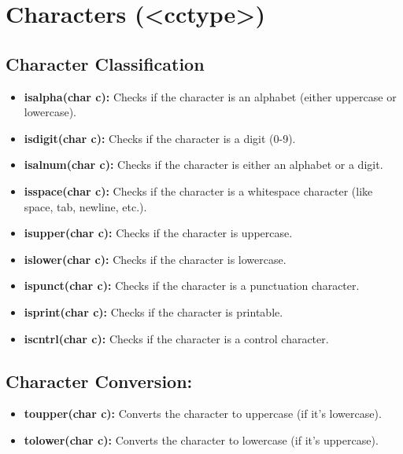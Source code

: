 \documentclass{report}
\begin{document}
    \bigbreak \noindent
    \section{\LARGE Characters (<cctype>)}
    \bigbreak \noindent 
    \subsection{Character Classification}
    \begin{itemize}
        \item \textbf{isalpha(char c):} Checks if the character is an alphabet (either uppercase or lowercase).
        \item \textbf{isdigit(char c):} Checks if the character is a digit (0-9).
        \item \textbf{isalnum(char c):} Checks if the character is either an alphabet or a digit.
        \item \textbf{isspace(char c):} Checks if the character is a whitespace character (like space, tab, newline, etc.).
        \item \textbf{isupper(char c):} Checks if the character is uppercase.
        \item \textbf{islower(char c):} Checks if the character is lowercase.
        \item \textbf{ispunct(char c):} Checks if the character is a punctuation character.
        \item \textbf{isprint(char c):} Checks if the character is printable.
        \item \textbf{iscntrl(char c):} Checks if the character is a control character.
    \end{itemize}
    \bigbreak \noindent 
    \subsection{Character Conversion:}
    \begin{itemize}
        \item \textbf{toupper(char c):} Converts the character to uppercase (if it's lowercase).
        \item \textbf{tolower(char c):} Converts the character to lowercase (if it's uppercase).
    \end{itemize}

\end{document}
